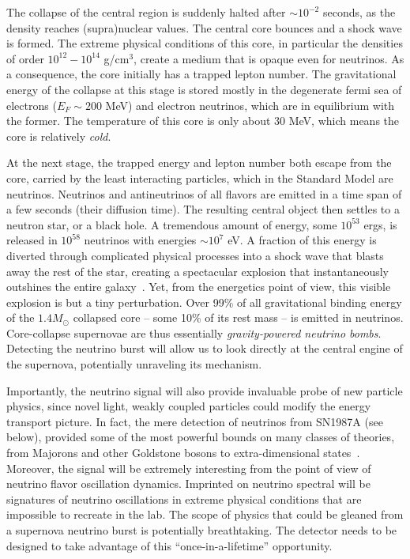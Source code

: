 The collapse of the central region is suddenly halted after $\sim 10^{-2}$ seconds, as the density reaches (supra)nuclear values. The central core bounces and a shock wave is formed. The extreme physical conditions of this core, in particular the densities of order $10^{12}-10^{14}$ g/cm$^{3}$, create a medium that is opaque even for neutrinos. As a consequence, the core initially has a trapped lepton number. The gravitational energy of the collapse at this stage is stored mostly in the degenerate fermi sea of electrons ($E_{F}\sim 200$ MeV) and electron neutrinos, which are in equilibrium with the former. The temperature of this core is only about 30 MeV, which means the core is relatively \emph{cold}. 

At the next stage, the trapped energy and lepton number both escape from the core, carried by the least interacting particles, which in the Standard Model are neutrinos.  Neutrinos and antineutrinos of all flavors are emitted in a time span of a few seconds (their diffusion time). The resulting central object then settles to a neutron star, or a black hole. A tremendous amount of energy, some $10^{53}$ ergs, is released in $10^{58}$ neutrinos with energies $\sim 10^{7}$ eV. A fraction of this energy is diverted through complicated physical processes into a shock wave that blasts away the rest of the star, creating a spectacular explosion that instantaneously outshines the entire galaxy~\cite{Janka:2012wk}. Yet, from the energetics point of view, this visible explosion is but a tiny perturbation. Over 99\% of all gravitational binding energy of the $1.4 M_{\odot}$ collapsed core -- some 10\% of its rest mass -- is emitted in neutrinos. Core-collapse supernovae are thus essentially \emph{gravity-powered neutrino bombs}.  Detecting the neutrino burst will allow us to look directly at the central engine of the supernova, potentially unraveling its mechanism. 

Importantly, the neutrino signal will also provide invaluable probe of new particle physics, since novel light, weakly coupled particles could modify the energy transport picture. In fact, the mere detection of neutrinos from SN1987A (see below), provided some of the most powerful bounds on many classes of theories, from Majorons and other Goldstone bosons to extra-dimensional states~\cite{Schramm:1990pf,Raffelt:1999tx}. Moreover, the signal will be extremely interesting from the point of view of neutrino flavor oscillation dynamics. Imprinted on neutrino spectral will be signatures of neutrino oscillations in extreme physical conditions that are impossible to recreate in the lab. The scope of physics that could be gleaned from a supernova neutrino burst is potentially breathtaking. The detector needs to be designed to take advantage of this ``once-in-a-lifetime'' opportunity.



